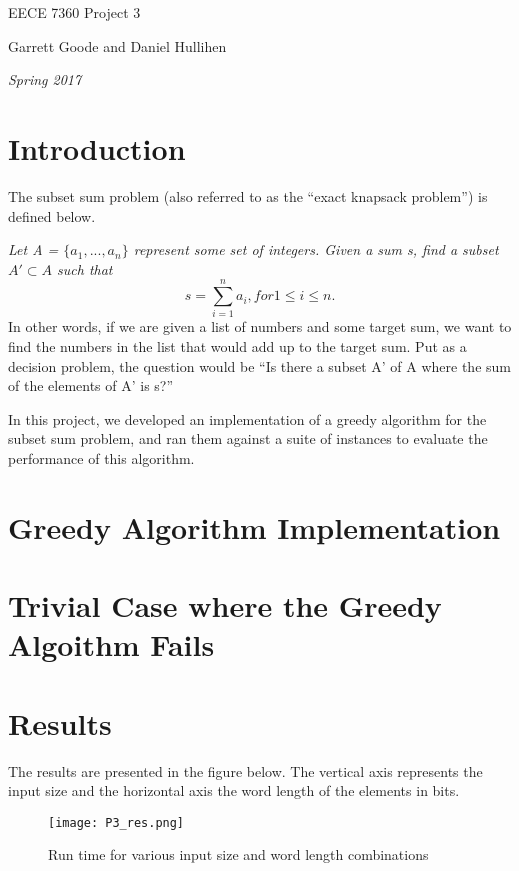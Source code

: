 \documentclass{article}
\begin{document}
\centerline{\sc \large EECE 7360 Project 3}
\vspace{.5pc}
\centerline{\sc Garrett Goode and Daniel Hullihen}
\centerline{\it Spring 2017}

\section{Introduction}
The subset sum problem (also referred to as the ``exact knapsack problem'')
is defined below.

\textit{Let A = $\{a_1, ..., a_n\}$ represent some set of integers. Given a sum s, find a subset $A' \subset A$ such that
  $$s = \sum_{i=1}^n a_i, for 1 \le i \le n.$$}
In other words, if we are given a list of numbers and some target sum, we want
to find the numbers in the list that would add up to the target sum. Put as a decision
problem, the question would be ``Is there a subset A' of A where the sum of the
elements of A' is s?''

In this project, we developed an implementation of a greedy algorithm
for the subset sum problem, and ran them against a suite of instances to evaluate
the performance of this algorithm.

\section{Greedy Algorithm Implementation}

\section{Trivial Case where the Greedy Algoithm Fails}

\section{Results}

The results are presented in the figure below. The vertical axis represents the
input size and the horizontal axis the word length of the elements in bits.

\begin{figure}[h]
\centering
\texttt{[image: P3\_res.png]}
\caption{Run time for various input size and word length combinations}
\end{figure}



\end{document}
